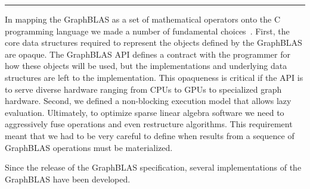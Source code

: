 \begin{table}[h]
\begin{center}
\end{center}
\hrule
\end{table}


In mapping the GraphBLAS as a set of mathematical operators onto the C programming language
we made a number of fundamental choices~\cite{cspec}.  First, the core data structures required
to represent the objects defined by the GraphBLAS are opaque.   The GraphBLAS API defines a 
contract with the programmer for how these objects will be used, but the implementations and underlying
data structures are left to the implementation.  This opaqueness is critical if the API is to serve diverse hardware
ranging from CPUs to GPUs to specialized graph hardware. Second, we defined a non-blocking  
execution model that allows lazy evaluation.  Ultimately, to optimize sparse linear algebra software we need
to aggressively fuse operations and even restructure algorithms.  This requirement meant that we had to 
be very careful to define when results from a sequence of GraphBLAS operations must be materialized.

Since the release of the GraphBLAS specification, several implementations of the GraphBLAS have been
developed.









